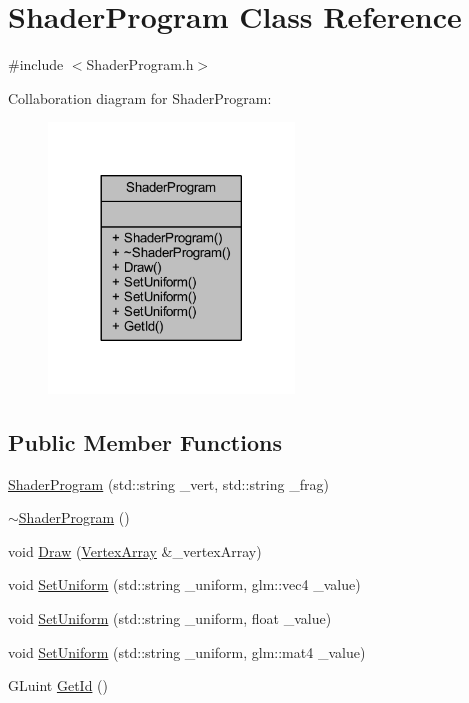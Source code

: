 \hypertarget{class_shader_program}{}\section{Shader\+Program Class Reference}
\label{class_shader_program}


{\ttfamily \#include $<$Shader\+Program.\+h$>$}



Collaboration diagram for Shader\+Program\+:
\nopagebreak
\begin{figure}[H]
\begin{center}
\leavevmode
\includegraphics[width=185pt]{class_shader_program__coll__graph}
\end{center}
\end{figure}
\subsection*{Public Member Functions}
\begin{DoxyCompactItemize}
\item 
\mbox{\hyperlink{class_shader_program_a835418de83ffd318d244286f9b1786d1}{Shader\+Program}} (std\+::string \+\_\+vert, std\+::string \+\_\+frag)
\item 
\mbox{\hyperlink{class_shader_program_a2d2eadcfc48cc2e2ddb82aba70553a9f}{$\sim$\+Shader\+Program}} ()
\item 
void \mbox{\hyperlink{class_shader_program_aca655dd6fd3034c99d01b7627789087f}{Draw}} (\mbox{\hyperlink{class_vertex_array}{Vertex\+Array}} \&\+\_\+vertex\+Array)
\item 
void \mbox{\hyperlink{class_shader_program_a415d4a54caef8913771ebce26478291c}{Set\+Uniform}} (std\+::string \+\_\+uniform, glm\+::vec4 \+\_\+value)
\item 
void \mbox{\hyperlink{class_shader_program_a6b964df4ebf8b6258ee1989e463d9a9b}{Set\+Uniform}} (std\+::string \+\_\+uniform, float \+\_\+value)
\item 
void \mbox{\hyperlink{class_shader_program_acf22820261bc06136eee4ece975fb164}{Set\+Uniform}} (std\+::string \+\_\+uniform, glm\+::mat4 \+\_\+value)
\item 
G\+Luint \mbox{\hyperlink{class_shader_program_a5b2653f0b69e26a9b867b1a7a3aec2ef}{Get\+Id}} ()
\end{DoxyCompactItemize}


